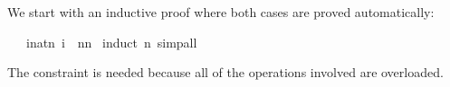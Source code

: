 \begin{isabellebody}
\begin{isamarkuptext}
We start with an inductive proof where both cases are proved automatically:%
\end{isamarkuptext}%
\isamarkuptrue%
\isamarkupfalse%
\ {\isachardoublequoteopen}{}\ {\isacharasterisk}\ {\isacharparenleft}{\isasymSum}i{\isacharcolon}{\isacharcolon}nat{\isasymle}n{\isachardot}\ i{\isacharparenright}\ {\isacharequal}\ n{\isacharasterisk}{\isacharparenleft}n{\isacharplus}{}{\isacharparenright}{\isachardoublequoteclose}\isanewline
%
\isadelimproof
%
\endisadelimproof
%
\isatagproof
{}\isamarkupfalse%
\ {\isacharparenleft}induct\ n{\isacharcomma}\ simp{\isacharunderscore}all{\isacharparenright}%
\endisatagproof
{\isafoldproof}%
%
\isadelimproof
%
\endisadelimproof
%
\begin{isamarkuptext}%
\noindent The constraint  is needed because all of
the operations involved are overloaded.


\end{isamarkuptext}
\end{isabellebody}
